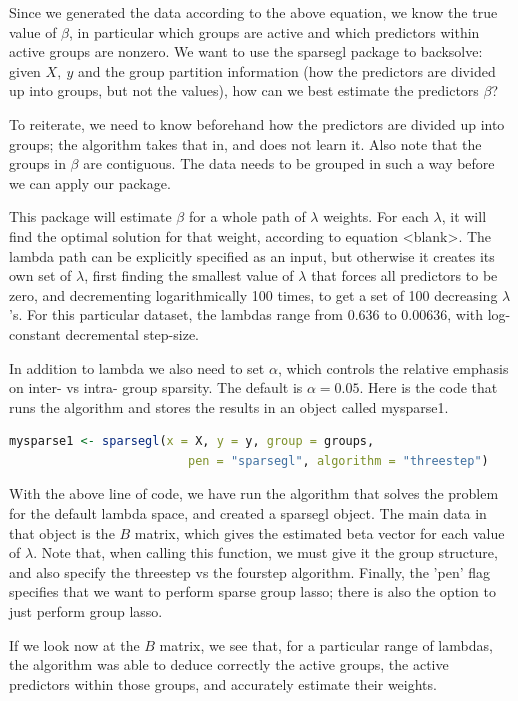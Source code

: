 \documentclass[titlepage]{article}
\begin{document}
Since we generated the data according to the above equation, we know the true value of $\beta$, in particular which groups are active and which predictors within active groups are nonzero. We want to use the sparsegl package to backsolve: given $X,\ y$ and the group partition information (how the predictors are divided up into groups, but not the values), how can we best estimate the predictors $\beta$?

To reiterate, we need to know beforehand how the predictors are divided up into groups; the algorithm takes that in, and does not learn it. Also note that the groups in $\beta$ are contiguous. The data needs to be grouped in such a way before we can apply our package.

This package will estimate $\beta$ for a whole path of $\lambda$ weights. For each $\lambda$, it will find the optimal solution for that weight, according to equation <blank>. The lambda path can be explicitly specified as an input, but otherwise it creates its own set of $\lambda$, first finding the smallest value of $\lambda$ that forces all predictors to be zero, and decrementing logarithmically 100 times, to get a set of 100 decreasing $\lambda$'s. For this particular dataset, the lambdas range from $0.636$ to $0.00636$, with log-constant decremental step-size.

In addition to lambda we also need to set $\alpha$, which controls the relative emphasis on inter- vs intra- group sparsity. The default is $\alpha = 0.05$. Here is the code that runs the algorithm and stores the results in an object called mysparse1.

\begin{lstlisting}[language=R]
mysparse1 <- sparsegl(x = X, y = y, group = groups,
                         pen = "sparsegl", algorithm = "threestep")
\end{lstlisting}
With the above line of code, we have run the algorithm that solves the problem for the default lambda space, and created a sparsegl object. The main data in that object is the $B$ matrix, which gives the estimated beta vector for each value of $\lambda$. Note that, when calling this function, we must give it the group structure, and also specify the threestep vs the fourstep algorithm. Finally, the 'pen' flag specifies that we want to perform sparse group lasso; there is also the option to just perform group lasso.

If we look now at the $B$ matrix, we see that, for a particular range of lambdas, the algorithm was able to deduce correctly the active groups, the active predictors within those groups, and accurately estimate their weights.
\end{document}
